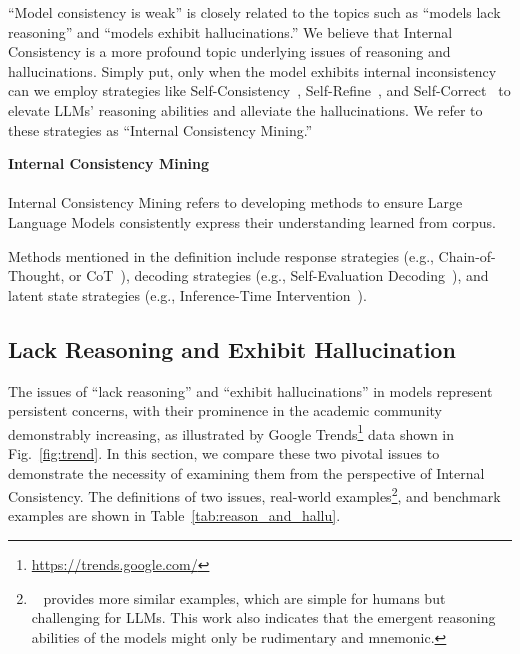 \documentclass[lettersize,journal]{IEEEtran}
\begin{document}
``Model consistency is weak'' is closely related to the topics such as ``models lack reasoning'' and ``models exhibit hallucinations.'' We believe that Internal Consistency is a more profound topic underlying issues of reasoning and hallucinations. Simply put, only when the model exhibits internal inconsistency can we employ strategies like Self-Consistency~\cite{SelfConsistency_23_ICLR_Google}, Self-Refine~\cite{SelfRefine_23_NeuIPS_CMU}, and Self-Correct~\cite{SelfCorrect_23_ICLR_AI2} to elevate LLMs' reasoning abilities and alleviate the hallucinations. We refer to these strategies as ``Internal Consistency Mining.''

\begin{tcolorbox}[colback=white!98!black,colframe=white!30!black,boxsep=1.1pt,top=6.75pt]%
\vspace{1.75pt}%
\textbf{Internal Consistency Mining}\\[-0.575em]
\noindent\makebox[\textwidth]{\rule{\textwidth}{0.4pt}}
\\[0.25em]
Internal Consistency Mining refers to developing methods to ensure Large Language Models consistently express their understanding learned from corpus.
\end{tcolorbox}

Methods mentioned in the definition include response strategies (e.g., Chain-of-Thought, or CoT~\cite{RealCoT_22_NeuIPS_Google}), decoding strategies (e.g., Self-Evaluation Decoding~\cite{SED_24_arXiv_FDU}), and latent state strategies (e.g., Inference-Time Intervention~\cite{ITI_23_NeuIPS_Harvard}).

\subsection{Lack Reasoning and Exhibit Hallucination} \label{sec:lack_reason_exhibit_hallu}


\noindent The issues of ``lack reasoning'' and ``exhibit hallucinations'' in models represent persistent concerns, with their prominence in the academic community demonstrably increasing, as illustrated by Google Trends\footnote{\url{https://trends.google.com/}} data shown in Fig.~\ref{fig:trend}. In this section, we compare these two pivotal issues to demonstrate the necessity of examining them from the perspective of Internal Consistency. The definitions of two issues, real-world examples\footnote{~\cite{nezhurina2024alice} provides more similar examples, which are simple for humans but challenging for LLMs. This work also indicates that the emergent reasoning abilities of the models might only be rudimentary and mnemonic.}, and benchmark examples are shown in Table~\ref{tab:reason_and_hallu}.
\end{document}
